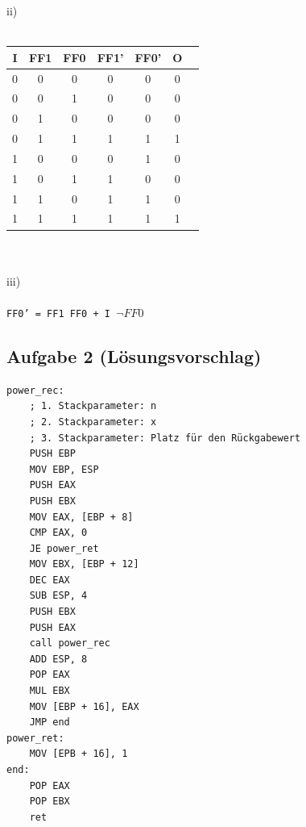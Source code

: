\documentclass{article}
\begin{document}
ii) \\
\\
\begin{tabular}{c|c|c|c|c|c|c}
   I  & FF1 & FF0 & FF1' & FF0' & O \\
    \hline
   0   &  0   & 0   &   0   &   0   & 0  \\
    \hline
   0  &   0  &  1   &  0    &   0   &  0 \\
     \hline
   0  &  1   &  0   &   0   &   0   & 0  \\
     \hline
   0  &   1  &  1   &   1   &   1   & 1  \\
     \hline
   1  &  0   &  0   &   0   &   1   &  0 \\
     \hline
   1  &   0  &  1   &   1   &   0   &  0 \\
     \hline
   1  &  1   &  0   &   1   &   1   & 0  \\
     \hline
   1  &  1   &   1  &   1   &   1   &  1 \\
     \hline
\end{tabular} \\
 \\
iii) \\
\\
\texttt{FF0' = FF1 FF0 + I $\neg FF0$}
\label{sec:lsg01}

\subsection{Aufgabe 2 (Lösungsvorschlag)}
\begin{verbatim}
power_rec:
    ; 1. Stackparameter: n
    ; 2. Stackparameter: x
    ; 3. Stackparameter: Platz für den Rückgabewert
    PUSH EBP
    MOV EBP, ESP
    PUSH EAX
    PUSH EBX
    MOV EAX, [EBP + 8]
    CMP EAX, 0
    JE power_ret
    MOV EBX, [EBP + 12]
    DEC EAX
    SUB ESP, 4
    PUSH EBX
    PUSH EAX
    call power_rec
    ADD ESP, 8
    POP EAX
    MUL EBX
    MOV [EBP + 16], EAX
    JMP end
power_ret:
    MOV [EPB + 16], 1
end:
    POP EAX
    POP EBX
    ret
\end{verbatim}
\label{sec:lsg02}
\end{document}

